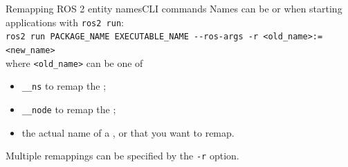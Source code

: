 \begin{frame}{Remapping ROS 2 entity names}{CLI commands}
  \justifying
  Names can be  or  when starting applications with \texttt{ros2 run}:\\
  \bigskip
  \texttt{ros2 run PACKAGE\_NAME EXECUTABLE\_NAME -{}-ros-args -r <old\_name>:=<new\_name>}\\
  \bigskip
  where \texttt{<old\_name>} can be one of
  \begin{itemize}
    \item \texttt{\_{}\_ns} to remap the ;
    \item \texttt{\_{}\_node} to remap the ;
    \item the actual name of a ,  or  that you want to remap.
  \end{itemize}
  \vspace{10pt}
  Multiple remappings can be specified by  the \texttt{-r} option.
\end{frame}

